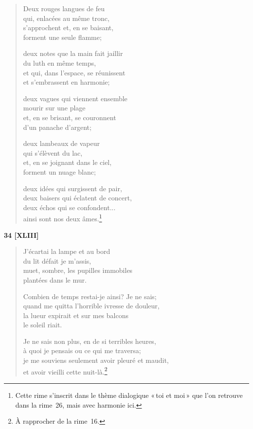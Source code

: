 \begin{verse}
  Deux rouges langues de feu \\
  qui, enlacées au même tronc, \\
  s'approchent et, en se baisant, \\
  forment une seule flamme;

  deux notes que la main fait jaillir \\
  du luth en même temps, \\
  et qui, dans l'espace, se réunissent \\
  et s'embrassent en harmonie;

  deux vagues qui viennent ensemble \\
  mourir sur une plage \\
  et, en se brisant, se couronnent \\
  d'un panache d'argent;

  deux lambeaux de vapeur \\
  qui s'élèvent du lac, \\
  et, en se joignant dans le ciel, \\
  forment un nuage blanc;

  deux idées qui surgissent de pair, \\
  deux baisers qui éclatent de concert, \\
  deux échos qui se confondent... \\
  ainsi sont nos deux âmes.\footnote{Cette rime s'inscrit dans le
  thème dialogique «\,toi et moi\,» que l'on retrouve dans la rime~26,
  mais avec harmonie ici.}
\end{verse}


\begin{center}
  \textbf{34 [XLIII]}
\end{center}

\begin{verse}
  J'écartai la lampe et au bord \\
  du lit défait je m'assis, \\
  muet, sombre, les pupilles immobiles \\
  plantées dans le mur.

  Combien de temps restai-je ainsi? Je ne sais; \\
  quand me quitta l'horrible ivresse de douleur, \\
  la lueur expirait et sur mes balcons \\
  le soleil riait.

  Je ne sais non plus, en de si terribles heures, \\
  à quoi je pensais ou ce qui me traversa; \\
  je me souviens seulement avoir pleuré et maudit, \\
  et avoir vieilli cette nuit-là.\footnote{À rapprocher de la rime~16.}
\end{verse}

